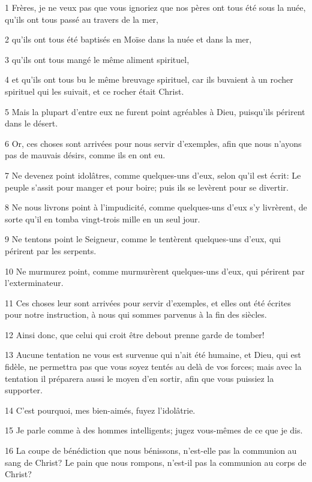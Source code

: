 \par 1 Frères, je ne veux pas que vous ignoriez que nos pères ont tous été sous la nuée, qu'ils ont tous passé au travers de la mer,
\par 2 qu'ils ont tous été baptisés en Moïse dans la nuée et dans la mer,
\par 3 qu'ils ont tous mangé le même aliment spirituel,
\par 4 et qu'ils ont tous bu le même breuvage spirituel, car ils buvaient à un rocher spirituel qui les suivait, et ce rocher était Christ.
\par 5 Mais la plupart d'entre eux ne furent point agréables à Dieu, puisqu'ils périrent dans le désert.
\par 6 Or, ces choses sont arrivées pour nous servir d'exemples, afin que nous n'ayons pas de mauvais désirs, comme ils en ont eu.
\par 7 Ne devenez point idolâtres, comme quelques-uns d'eux, selon qu'il est écrit: Le peuple s'assit pour manger et pour boire; puis ils se levèrent pour se divertir.
\par 8 Ne nous livrons point à l'impudicité, comme quelques-uns d'eux s'y livrèrent, de sorte qu'il en tomba vingt-trois mille en un seul jour.
\par 9 Ne tentons point le Seigneur, comme le tentèrent quelques-uns d'eux, qui périrent par les serpents.
\par 10 Ne murmurez point, comme murmurèrent quelques-uns d'eux, qui périrent par l'exterminateur.
\par 11 Ces choses leur sont arrivées pour servir d'exemples, et elles ont été écrites pour notre instruction, à nous qui sommes parvenus à la fin des siècles.
\par 12 Ainsi donc, que celui qui croit être debout prenne garde de tomber!
\par 13 Aucune tentation ne vous est survenue qui n'ait été humaine, et Dieu, qui est fidèle, ne permettra pas que vous soyez tentés au delà de vos forces; mais avec la tentation il préparera aussi le moyen d'en sortir, afin que vous puissiez la supporter.
\par 14 C'est pourquoi, mes bien-aimés, fuyez l'idolâtrie.
\par 15 Je parle comme à des hommes intelligents; jugez vous-mêmes de ce que je dis.
\par 16 La coupe de bénédiction que nous bénissons, n'est-elle pas la communion au sang de Christ? Le pain que nous rompons, n'est-il pas la communion au corps de Christ?
